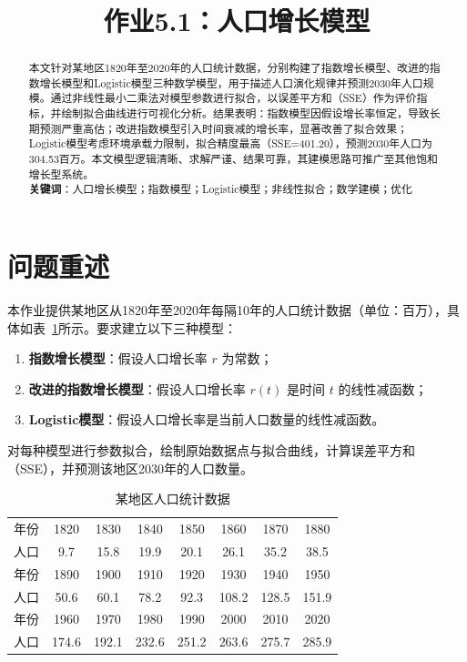 \documentclass[12pt]{ctexart}
\title{作业5.1：人口增长模型}
\author{}
\date{}
\begin{document}
\maketitle

\begin{abstract}
本文针对某地区1820年至2020年的人口统计数据，分别构建了指数增长模型、改进的指数增长模型和Logistic模型三种数学模型，用于描述人口演化规律并预测2030年人口规模。通过非线性最小二乘法对模型参数进行拟合，以误差平方和（SSE）作为评价指标，并绘制拟合曲线进行可视化分析。结果表明：指数模型因假设增长率恒定，导致长期预测严重高估；改进指数模型引入时间衰减的增长率，显著改善了拟合效果；Logistic模型考虑环境承载力限制，拟合精度最高（SSE=401.20），预测2030年人口为304.53百万。本文模型逻辑清晰、求解严谨、结果可靠，其建模思路可推广至其他饱和增长型系统。
\\
\textbf{关键词}：人口增长模型；指数模型；Logistic模型；非线性拟合；数学建模；优化
\end{abstract}

\section{问题重述}
本作业提供某地区从1820年至2020年每隔10年的人口统计数据（单位：百万），具体如表~\ref{tab:population_data}所示。要求建立以下三种模型：
\begin{enumerate}
    \item \textbf{指数增长模型}：假设人口增长率 $r$ 为常数；
    \item \textbf{改进的指数增长模型}：假设人口增长率 $r(t)$ 是时间 $t$ 的线性减函数；
    \item \textbf{Logistic模型}：假设人口增长率是当前人口数量的线性减函数。
\end{enumerate}
对每种模型进行参数拟合，绘制原始数据点与拟合曲线，计算误差平方和（SSE），并预测该地区2030年的人口数量。

\begin{table}[H]
\centering
\caption{某地区人口统计数据}
\label{tab:population_data}
\begin{tabular}{cccccccc}
\toprule
年份 & 1820 & 1830 & 1840 & 1850 & 1860 & 1870 & 1880 \\
人口 & 9.7 & 15.8 & 19.9 & 20.1 & 26.1 & 35.2 & 38.5 \\
\midrule
年份 & 1890 & 1900 & 1910 & 1920 & 1930 & 1940 & 1950 \\
人口 & 50.6 & 60.1 & 78.2 & 92.3 & 108.2 & 128.5 & 151.9 \\
\midrule
年份 & 1960 & 1970 & 1980 & 1990 & 2000 & 2010 & 2020 \\
人口 & 174.6 & 192.1 & 232.6 & 251.2 & 263.6 & 275.7 & 285.9 \\
\bottomrule
\end{tabular}
\end{table}
\end{document}
